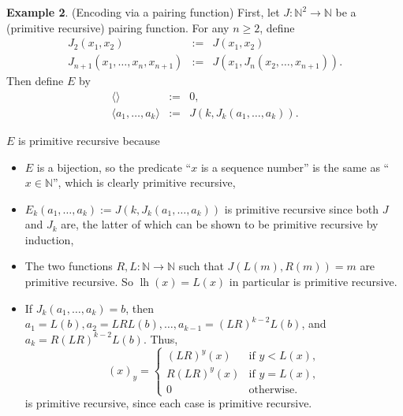 \documentclass[12pt]{article}
\begin{document}
\textbf{Example 2}.  (Encoding via a pairing function)  First, let $J: \mathbb{N}^2 \to \mathbb{N}$ be a (primitive recursive) pairing function.  For any $n \ge 2$, define 
\begin{eqnarray*}
J_2(x_1,x_2) &:=&  J(x_1, x_2) \\
J_{n+1}(x_1,\ldots, x_n, x_{n+1}) &:=& J( x_1, J_n(x_2, \ldots, x_{n+1})).
\end{eqnarray*}
Then define $E$ by
\begin{eqnarray*}
\langle \rangle &:=& 0, \\
\langle a_1 , \ldots, a_k \rangle &:=&  J(k, J_k(a_1, \ldots, a_k)).
\end{eqnarray*}

$E$ is primitive recursive because
\begin{itemize}
\item $E$ is a bijection, so the predicate ``$x$ is a sequence number'' is the same as ``$x \in \mathbb{N}$'', which is clearly primitive recursive,
\item $E_k(a_1,\ldots,a_k):= J(k, J_k(a_1, \ldots, a_k))$ is primitive recursive since both $J$ and $J_k$ are, the latter of which can be shown to be primitive recursive by induction,
\item The two functions $R,L: \mathbb{N}\to \mathbb{N}$ such that $J(L(m),R(m))=m$ are primitive recursive.  So  $\operatorname{lh}(x)=L(x)$ in particular is primitive recursive.
\item If $J_k(a_1,\ldots, a_k)=b$, then $a_1=L(b), a_2=LRL(b), \ldots, a_{k-1} = (LR)^{k-2}L(b)$, and $a_k = R(LR)^{k-2}L(b)$.  Thus, 
\begin{displaymath}
(x)_y = \left\{
\begin{array}{ll}
(LR)^y(x) & \textrm{if } y < L(x) , \\
R(LR)^y(x) & \textrm{if } y = L(x), \\
0 & \textrm{otherwise}.
\end{array}
\right.
\end{displaymath}
is primitive recursive, since each case is primitive recursive.
\end{itemize}
\end{document}
